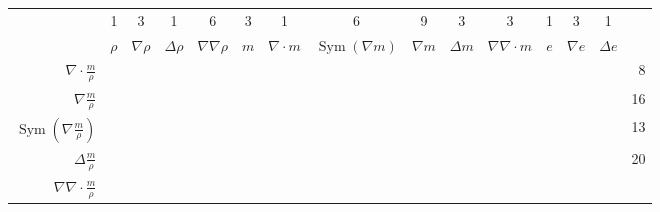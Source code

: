 \documentclass[letterpaper,11pt,nointlimits,reqno]{amsart}
\newcommand{\symmetricpart}[1]
  {\ensuremath{\operatorname{Sym}\left(#1\right)}}
\begin{document}
\begin{table}[p]
\centering
\vspace{1em}
\renewcommand{\arraystretch}{1.40}   %
\newcommand{\cm}{\checkmark}         %
\newcommand{\cd}{\ensuremath{\cdot}} %
\begin{tabular}{r|cccc|cccccc|ccc|r}
&   1 &   3 &   1 &   6 &   3 &   1 &   6 &   9 &   3 &   3 &   1 &   3 &   1
\\
& $\rho$                                              %
& $\nabla\rho$                                        %
& $\Delta\rho$                                        %
& $\nabla\nabla\rho$                                  %
& $m$                                                 %
& $\nabla\cdot{}m$                                    %
& $\symmetricpart{\nabla{}m}$                         %
& $\nabla{}m$                                         %
& $\Delta{}m$                                         %
& $\nabla\nabla\cdot{}m$                              %
& $e$                                                 %
& $\nabla{}e$                                         %
& $\Delta{}e$                                         %
\\ \hline
$\nabla\cdot\frac{m}{\rho}$
& \cm & \cm &     &     & \cm & \cm &     &     &     &     &     &     &
& 8 \\
$\nabla\frac{m}{\rho}$
& \cm & \cm &     &     & \cm &     &     & \cm &     &     &     &     &
& 16 \\
$\symmetricpart{\nabla\frac{m}{\rho}}$
& \cm & \cm &     &     & \cm &     & \cm &     &     &     &     &     &
& 13 \\
$\Delta\frac{m}{\rho}$
& \cm & \cm & \cm &     & \cm &     &     & \cm & \cm &     &     &     &
& 20 \\
$\nabla\nabla\cdot\frac{m}{\rho}$

\end{tabular}
\end{table}
\end{document}
